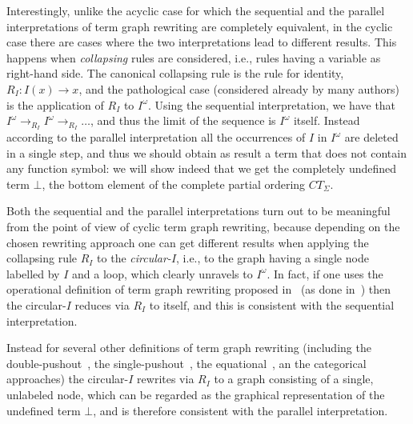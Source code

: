 \documentclass{eptcs}
\theoremstyle{plain}
\theoremstyle{definition}
\begin{document}
Interestingly, unlike the acyclic case for which the sequential and
the parallel interpretations of term graph rewriting are completely
equivalent, in the cyclic case there are cases
where the two interpretations lead to different results. This
happens when {\em collapsing\/} rules are considered, 
i.e.,
rules having a variable as right-hand side.
The canonical collapsing rule is the rule for identity, $R_I: I(x)
\rightarrow x$, and the pathological case (considered already by many
authors) is the application of $R_I$ to $I^\omega$. Using the sequential
interpretation, we have that $I^\omega \rightarrow_{R_I}
I^\omega \rightarrow_{R_I} \ldots$, and thus the limit of the
sequence is $I^\omega$ itself. Instead according to the parallel
interpretation all the occurrences of $I$ in $I^\omega$ are deleted
in a single step, and thus we should obtain as result a term 
that does not contain any function symbol: we will show indeed that we get
the completely undefined term $\bot$, the bottom element of the
complete partial ordering $CT_\Sigma$. 

Both the sequential and the parallel interpretations turn out to be  
meaningful from the point of view of cyclic term graph rewriting, 
because depending on the chosen rewriting approach one can get 
different results when applying the collapsing rule $R_I$ to the
\emph{circular-$I$}, i.e., to the graph having a single node labelled by
$I$ and a loop, which clearly unravels to $I^\omega$.
In fact, if one uses the operational definition of term graph
rewriting proposed in~\cite{BEGKPS:TGR} (as done  
in~\cite{KKSV:AGRS,FRW:CPCR,FW:RCTG}) then 
the circular-$I$  reduces via $R_I$ to itself, and this is 
consistent with the sequential interpretation.

Instead for several other definitions of term graph rewriting
(including the double-pushout~\cite{HP:ITRJ,CR:HRJR}, the
single-pushout~\cite{Ken:GRSC}, the
equational~\cite{DBLP:journals/fuin/AriolaK96}, an the
categorical~\cite{CG:RCSE} approaches) the circular-$I$ rewrites via
$R_I$ to a graph consisting of a single, unlabeled node, which can be
regarded as the graphical representation of the undefined term $\bot$,
and is therefore consistent with the parallel interpretation.
\end{document}
